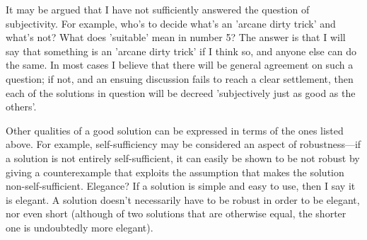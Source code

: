 It may be argued that I have not sufficiently answered the question of
subjectivity. For example, who's to decide what's an 'arcane dirty
trick' and what's not? What does 'suitable' mean in number 5? The
answer is that I will say that something is an 'arcane dirty trick' if
I think so, and anyone else can do the same. In most cases I believe
that there will be general agreement on such a question; if not, and an
ensuing discussion fails to reach a clear settlement, then each of the
solutions in question will be decreed 'subjectively just as good as the
others'.

Other qualities of a good solution can be expressed in terms of the
ones listed above. For example, self-sufficiency may be considered an
aspect of robustness---if a solution is not entirely self-sufficient,
it can easily be shown to be not robust by giving a counterexample that
exploits the assumption that makes the solution non-self-sufficient.
Elegance?  If a solution is simple and easy to use, then I say it is
elegant. A solution doesn't necessarily have to be robust in order to
be elegant, nor even short (although of two solutions that are
otherwise equal, the shorter one is undoubtedly more elegant).

\begin{comment}

[Solution for exercise 5 moved to answer.005]


Table of special characters (ASCII):

33: ! exclamation point;      59: ; semicolon;
34: " double quote;           60: < left elbow;
35: # number/pound sign;      61: = equals sign;
36: $ dollar sign;            62: > right elbow;
37: %
38: & ampersand;              64: @ at sign;
39: ' right quote/apostrophe; 91: [ left square bracket;
40: ( left parenthesis;       92: \ backslash;
41: ) right parenthesis;      93: ] right square bracket;
42: * star/asterisk;          94: ^ circumflex/hat/caret;
43: + plus sign;              95: _ underscore;
44: , comma;                  96: ` left quote;
45: - hyphen;                 123: { left curly brace;
46: . period/dot/point;       124: | vert bar;
47: / slash;                  125: } right curly brace;
58: : colon;                  126: ~ tilde
Michael Downes                              mjd@math.ams.com (Internet)

\end{comment}

